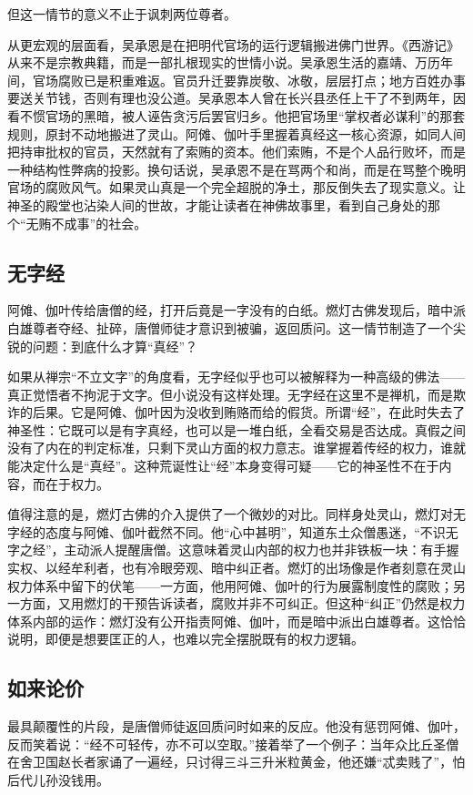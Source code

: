 \documentclass{ctexart}
\begin{document}
但这一情节的意义不止于讽刺两位尊者。

从更宏观的层面看，吴承恩是在把明代官场的运行逻辑搬进佛门世界。《西游记》从来不是宗教典籍，而是一部扎根现实的世情小说。吴承恩生活的嘉靖、万历年间，官场腐败已是积重难返。官员升迁要靠炭敬、冰敬，层层打点；地方百姓办事要送关节钱，否则有理也没公道。吴承恩本人曾在长兴县丞任上干了不到两年，因看不惯官场的黑暗，被人诬告贪污后罢官归乡。他把官场里“掌权者必谋利”的那套规则，原封不动地搬进了灵山。阿傩、伽叶手里握着真经这一核心资源，如同人间把持审批权的官员，天然就有了索贿的资本。他们索贿，不是个人品行败坏，而是一种结构性弊病的投影。换句话说，吴承恩不是在骂两个和尚，而是在骂整个晚明官场的腐败风气。如果灵山真是一个完全超脱的净土，那反倒失去了现实意义。让神圣的殿堂也沾染人间的世故，才能让读者在神佛故事里，看到自己身处的那个“无贿不成事”的社会。

\subsection{无字经}

阿傩、伽叶传给唐僧的经，打开后竟是一字没有的白纸。燃灯古佛发现后，暗中派白雄尊者夺经、扯碎，唐僧师徒才意识到被骗，返回质问。这一情节制造了一个尖锐的问题：到底什么才算“真经”？

如果从禅宗“不立文字”的角度看，无字经似乎也可以被解释为一种高级的佛法——真正觉悟者不拘泥于文字。但小说没有这样处理。无字经在这里不是禅机，而是欺诈的后果。它是阿傩、伽叶因为没收到贿赂而给的假货。所谓“经”，在此时失去了神圣性：它既可以是有字真经，也可以是一堆白纸，全看交易是否达成。真假之间没有了内在的判定标准，只剩下灵山方面的权力意志。谁掌握着传经的权力，谁就能决定什么是“真经”。这种荒诞性让“经”本身变得可疑——它的神圣性不在于内容，而在于权力。

值得注意的是，燃灯古佛的介入提供了一个微妙的对比。同样身处灵山，燃灯对无字经的态度与阿傩、伽叶截然不同。他“心中甚明”，知道东土众僧愚迷，“不识无字之经”，主动派人提醒唐僧。这意味着灵山内部的权力也并非铁板一块：有手握实权、以经牟利者，也有冷眼旁观、暗中纠正者。燃灯的出场像是作者刻意在灵山权力体系中留下的伏笔——一方面，他用阿傩、伽叶的行为展露制度性的腐败；另一方面，又用燃灯的干预告诉读者，腐败并非不可纠正。但这种“纠正”仍然是权力体系内部的运作：燃灯没有公开指责阿傩、伽叶，而是暗中派出白雄尊者。这恰恰说明，即便是想要匡正的人，也难以完全摆脱既有的权力逻辑。

\subsection{如来论价}

最具颠覆性的片段，是唐僧师徒返回质问时如来的反应。他没有惩罚阿傩、伽叶，反而笑着说：“经不可轻传，亦不可以空取。”接着举了一个例子：当年众比丘圣僧在舍卫国赵长者家诵了一遍经，只讨得三斗三升米粒黄金，他还嫌“忒卖贱了”，怕后代儿孙没钱用。
\end{document}
